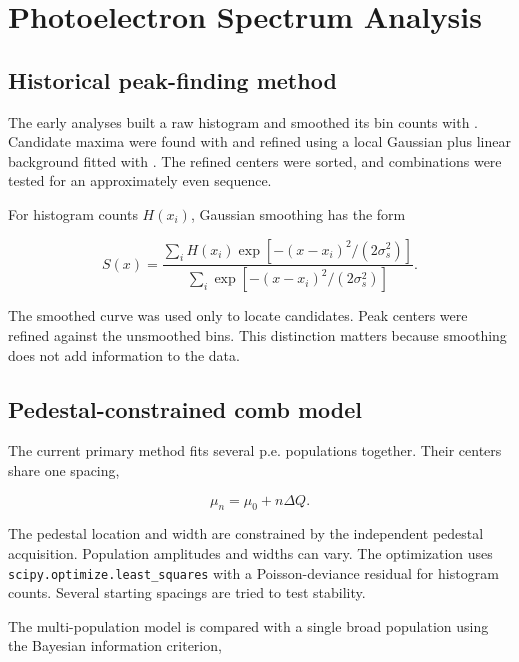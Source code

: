 \section{Photoelectron Spectrum Analysis}

\subsection{Historical peak-finding method}

The early analyses built a raw histogram and smoothed its bin counts with
. Candidate maxima were found with
 and refined using a local Gaussian plus linear background fitted with
. The refined centers were sorted, and combinations were tested for an approximately even sequence.

For histogram counts $H(x_i)$, Gaussian smoothing has the form

\begin{equation}
  S(x)=\frac{\sum_i H(x_i)\exp\left[-(x-x_i)^2/(2\sigma_s^2)\right]}
  {\sum_i \exp\left[-(x-x_i)^2/(2\sigma_s^2)\right]}.
\end{equation}

The smoothed curve was used only to locate candidates. Peak centers were refined against the unsmoothed bins. This distinction matters because smoothing does not add information to the data.

\subsection{Pedestal-constrained comb model}

The current primary method fits several p.e. populations together. Their centers share one spacing,

\begin{equation}
  \mu_n=\mu_0+n\Delta Q.
  \label{eq:comb-centers}
\end{equation}

The pedestal location and width are constrained by the independent pedestal acquisition. Population amplitudes and widths can vary. The optimization uses \texttt{scipy.optimize.least\_squares} with a Poisson-deviance residual for histogram counts. Several starting spacings are tried to test stability.

The multi-population model is compared with a single broad population using the Bayesian information criterion,

